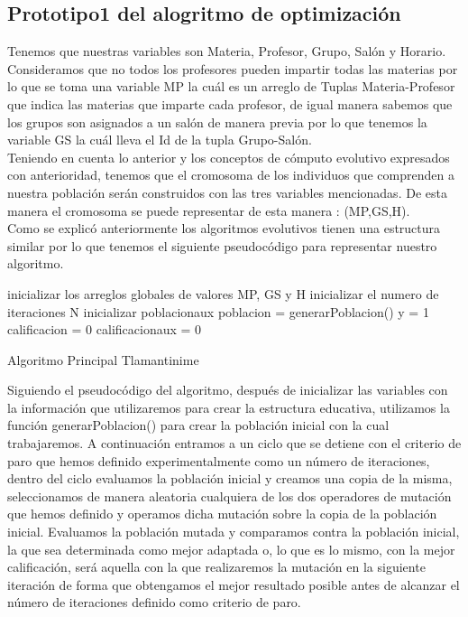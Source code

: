 \subsection{Prototipo1 del alogritmo de optimización}

Tenemos que nuestras variables son Materia, Profesor, Grupo, Salón y Horario. Consideramos que no todos los profesores pueden impartir todas las materias por lo que se toma una variable MP la cuál es un arreglo de Tuplas Materia-Profesor que indica las materias que imparte cada profesor, de igual manera sabemos que los grupos son asignados a un salón de manera previa por lo que tenemos la variable GS la cuál lleva el Id de la tupla Grupo-Salón.\\

Teniendo en cuenta lo anterior y los conceptos de cómputo evolutivo expresados con anterioridad, tenemos que el cromosoma de los individuos que comprenden a nuestra población serán construidos con las tres variables mencionadas. De esta manera el cromosoma se puede representar de esta manera : (MP,GS,H).\\

Como se explicó anteriormente los algoritmos evolutivos tienen una estructura similar por lo que tenemos el siguiente pseudocódigo para representar nuestro algoritmo.\\

\begin{algorithm}[H]
	\DontPrintSemicolon
	\SetAlgoLined
	inicializar los arreglos globales de valores MP, GS y H\;
	inicializar el numero de iteraciones N\;
	inicializar poblacionaux\;
	poblacion = generarPoblacion()\;
	y = 1\;
	calificacion = 0 \;
	calificacionaux = 0 \;
	
	\caption{Algoritmo Principal Tlamantinime}
\end{algorithm}

Siguiendo el pseudocódigo del algoritmo, después de inicializar las variables con la información que utilizaremos para crear la estructura educativa, utilizamos la función generarPoblacion() para crear la población inicial con la cual trabajaremos. A continuación entramos a un ciclo que se detiene con el criterio de paro que hemos definido experimentalmente como un número de iteraciones, dentro del ciclo evaluamos la población inicial y creamos una copia de la misma, seleccionamos de manera aleatoria cualquiera de los dos operadores de mutación que hemos definido y operamos dicha mutación sobre la copia de la población inicial. Evaluamos la población mutada y comparamos contra la población inicial, la que sea determinada como mejor adaptada o, lo que es lo mismo, con la mejor calificación, será aquella con la que realizaremos la mutación en la siguiente iteración de forma que obtengamos el mejor resultado posible antes de alcanzar el número de iteraciones definido como criterio de paro.

